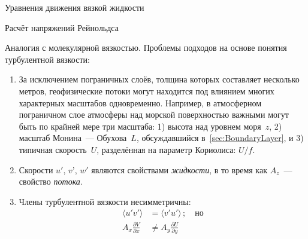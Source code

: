\begin{chapter}{Уравнения движения вязкой жидкости}
\begin{section}{Расчёт напряжений Рейнольдса}
\begin{paragraph}{Аналогия с молекулярной вязкостью.}
Проблемы подходов на основе понятия турбулентной вязкости:
%
\begin{enumerate}
\item 
За исключением пограничных слоёв, толщина которых составляет несколько метров,
геофизические потоки могут находится под влиянием многих характерных масштабов
одновременно. Например, в атмосферном пограничном слое атмосферы 
над морской поверхностью важными могут быть по крайней мере три масштаба:
1) высота над уровнем моря~$z$, 2) масштаб Монина~--- Обухова~$L$, 
обсуждавшийся в~\ref{sec:BoundaryLayer}, 
и 3) типичная скорость~$U$, разделённая на параметр Кориолиса: $U/f$.
%

\item
Скорости $u'$, $v’$, $w'$ являются свойствами \emph{жидкости}, в то время
как $A_z$~--- свойство \emph{потока}.
%

\item
Члены турбулентной вязкости несимметричны:
\begin{align*}
\langle u'v' \rangle &= \langle v'u' \rangle\,;\quad \text{но} \\
A_x \frac{\partial{V}}{\partial{x}} &\neq A_y \frac{\partial{U}}{\partial{y}}
\end{align*}
%
\end{enumerate}
\end{paragraph}


\end{section}
\end{chapter}
